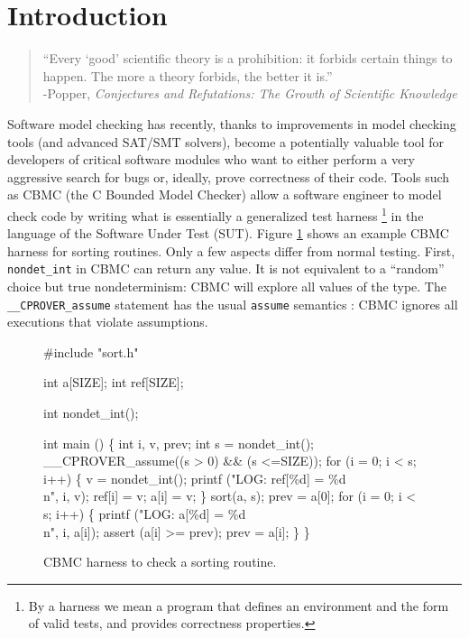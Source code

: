 \documentclass{svjour3}
\begin{document}
\section{Introduction}


\begin{quote}
``Every `good' scientific theory is a prohibition: it forbids certain things to happen. The 
more a theory forbids, the better it is.''\\
-Popper, \emph{Conjectures and Refutations: The Growth of 
  Scientific Knowledge} \cite{popperconjectures}
\end{quote}

Software model checking \cite{ModelChecking} has recently, thanks to
improvements in model checking tools (and advanced SAT/SMT solvers), become
a potentially valuable tool for developers of critical software
modules who want to either perform a very aggressive search for
bugs or, ideally, prove correctness of their code.  Tools such as
CBMC \cite{CBMCp} (the C Bounded Model Checker) allow a software
engineer to model check code by writing what is essentially a
generalized test harness \cite{woda12,woda08}\footnote{By a harness we mean a program that
  defines an environment and the form of valid tests, and provides
  correctness properties.} in the language of the Software Under Test
(SUT).  Figure \ref{fig:sortharness} shows an example CBMC harness for
sorting routines.  Only a few aspects differ from normal testing.
First, {\tt nondet\_int} in CBMC can return any value.  It is
not equivalent to a ``random'' choice but true nondeterminism: CBMC
will explore all values of the type.  The {\tt \_\_CPROVER\_assume}
statement has the usual
{\tt assume} semantics \cite{EWD:Discipline,exploit}: CBMC ignores
all executions that violate assumptions.

\begin{figure}
{%
\begin{code}
\#include "sort.h"

int a[SIZE];
int ref[SIZE];

int nondet\_int();

int main () \{
  int i, v, prev;
  int s = nondet\_int();
  \_\_CPROVER\_assume((s > 0) \&\& (s <=SIZE));
  for (i = 0; i < s; i++) \{
    v = nondet\_int();
    printf ("LOG: ref[\%d] = \%d\\n", i, v);
    ref[i] = v; a[i] = v;
  \}
  sort(a, s);
  prev = a[0];
  for (i = 0; i < s; i++) \{
    printf ("LOG: a[\%d] = \%d\\n", i, a[i]);
    assert (a[i] >= prev);
    prev = a[i];
  \}
\}
\end{code}
}
\caption{CBMC harness to check a sorting routine.}
\label{fig:sortharness}
\end{figure}
\end{document}
